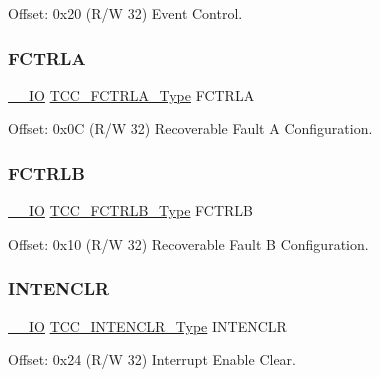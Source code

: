 Offset\+: 0x20 (R/W 32) Event Control. 

\mbox{\label{struct_tcc_a03e99b5d80cc8c4507ace1e2c4234adf}} 
\subsubsection{\texorpdfstring{FCTRLA}{FCTRLA}}
{\footnotesize\ttfamily \mbox{\hyperlink{core__cm0plus_8h_aec43007d9998a0a0e01faede4133d6be}{\+\_\+\+\_\+\+IO}} \mbox{\hyperlink{union_t_c_c___f_c_t_r_l_a___type}{T\+C\+C\+\_\+\+F\+C\+T\+R\+L\+A\+\_\+\+Type}} F\+C\+T\+R\+LA}



Offset\+: 0x0C (R/W 32) Recoverable Fault A Configuration. 

\mbox{\label{struct_tcc_a46b880c5a28c3b17c20fc1d76ce2b093}} 
\subsubsection{\texorpdfstring{FCTRLB}{FCTRLB}}
{\footnotesize\ttfamily \mbox{\hyperlink{core__cm0plus_8h_aec43007d9998a0a0e01faede4133d6be}{\+\_\+\+\_\+\+IO}} \mbox{\hyperlink{union_t_c_c___f_c_t_r_l_b___type}{T\+C\+C\+\_\+\+F\+C\+T\+R\+L\+B\+\_\+\+Type}} F\+C\+T\+R\+LB}



Offset\+: 0x10 (R/W 32) Recoverable Fault B Configuration. 

\mbox{\label{struct_tcc_a444b5d7ae83cf9c73ece383f39c4c7ba}} 
\subsubsection{\texorpdfstring{INTENCLR}{INTENCLR}}
{\footnotesize\ttfamily \mbox{\hyperlink{core__cm0plus_8h_aec43007d9998a0a0e01faede4133d6be}{\+\_\+\+\_\+\+IO}} \mbox{\hyperlink{union_t_c_c___i_n_t_e_n_c_l_r___type}{T\+C\+C\+\_\+\+I\+N\+T\+E\+N\+C\+L\+R\+\_\+\+Type}} I\+N\+T\+E\+N\+C\+LR}



Offset\+: 0x24 (R/W 32) Interrupt Enable Clear. 

\mbox{\label{struct_tcc_a22a208b86a37c61d35daf19fe8a3e8d8}} 
